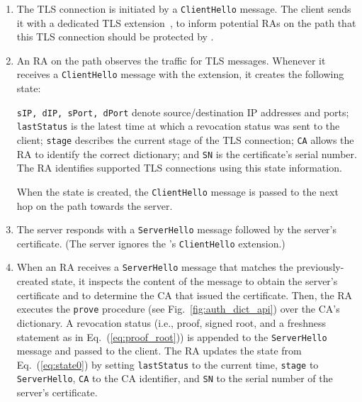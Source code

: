 \begin{enumerate}[leftmargin=*]
  \item The TLS connection is initiated by a \texttt{ClientHello} message. The
    client sends it with a dedicated TLS extension~\cite{rfc5246}, to inform
    potential RAs on the path that this TLS connection should be protected by
    \name.

  \item An RA on the path observes the traffic for TLS messages. Whenever it
    receives a \texttt{ClientHello} message with the \name extension, it creates
    the following state:
    
    \texttt{sIP, dIP, sPort, dPort} denote source/destination IP addresses and ports;
    \texttt{lastStatus} is the latest time at which a revocation status was sent
    to the client; \texttt{stage} describes the current stage of the TLS
    connection; \texttt{CA} allows the RA to identify the correct dictionary;
    and \texttt{SN} is the certificate's serial number. The RA identifies
    supported TLS connections using this state information.

    When the state is created, the \texttt{ClientHello} message is passed to
    the next hop on the path towards the server.

  \item The server responds with a \texttt{ServerHello} message followed by
    the server's certificate. (The server ignores the \name's
    \texttt{ClientHello} extension.)

  \item When an RA receives a \texttt{ServerHello} message that matches the
    previously-created state, it inspects the content of the message to
    obtain the server's certificate and to determine the CA that issued the
    certificate. Then, the RA executes the \texttt{prove} procedure (see
    Fig.~\ref{fig:auth_dict_api}) over the CA's dictionary. A revocation status
    (i.e., proof, signed root, and a freshness statement as in
    Eq.~(\ref{eq:proof_root})) is appended to the \texttt{ServerHello} message
    and passed to the client. The RA updates the state from
    Eq.~(\ref{eq:state0}) by setting
    \texttt{lastStatus} to the current time, \texttt{stage} to
    \texttt{ServerHello}, \texttt{CA} to the CA identifier, and
    \texttt{SN} to the serial number of the server's certificate.


\end{enumerate}
